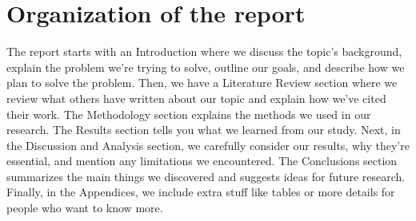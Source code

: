 
\section{Organization of the report}
\label{sec:into_back} 
The report starts with an Introduction where we discuss the topic's background, explain the problem we're trying to solve, outline our goals, and describe how we plan to solve the problem. Then, we have a Literature Review section where we review what others have written about our topic and explain how we've cited their work. The Methodology section explains the methods we used in our research. The Results section tells you what we learned from our study. Next, in the Discussion and Analysis section, we carefully consider our results, why they're essential, and mention any limitations we encountered. The Conclusions section summarizes the main things we discovered and suggests ideas for future research. Finally, in the Appendices, we include extra stuff like tables or more details for people who want to know more.






